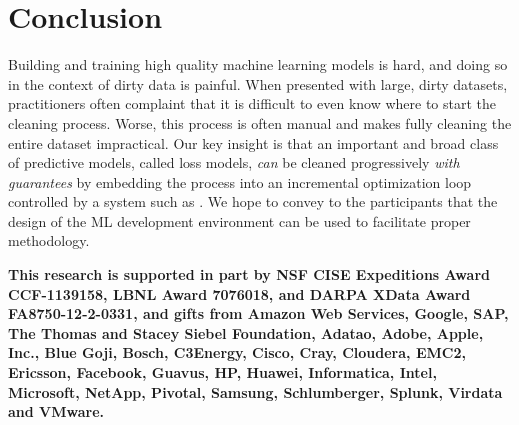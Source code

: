 \section{Conclusion}
Building and training high quality machine learning models is hard, and doing so in the context of dirty data is painful.
When presented with large, dirty datasets, practitioners often complaint that it is difficult to even know where to start the cleaning process.
Worse, this process is often manual and makes fully cleaning the entire dataset impractical.  
Our key insight is that an important and broad class of predictive models, called loss models, 
{\it can} be cleaned progressively {\it with guarantees} by embedding the process into an incremental optimization loop controlled by a system such as \sys.
We hope to convey to the participants that the design of the ML development environment can be used to facilitate proper methodology.

\vspace{0.5em}

\textbf{\scriptsize This research is supported in part by NSF CISE Expeditions Award CCF-1139158, LBNL Award 7076018, and DARPA XData Award FA8750-12-2-0331, and gifts from Amazon Web Services, Google, SAP, The Thomas and Stacey Siebel Foundation, Adatao, Adobe, Apple, Inc., Blue Goji, Bosch, C3Energy, Cisco, Cray, Cloudera, EMC2, Ericsson, Facebook, Guavus, HP, Huawei, Informatica, Intel, Microsoft, NetApp, Pivotal, Samsung, Schlumberger, Splunk, Virdata and VMware.}
